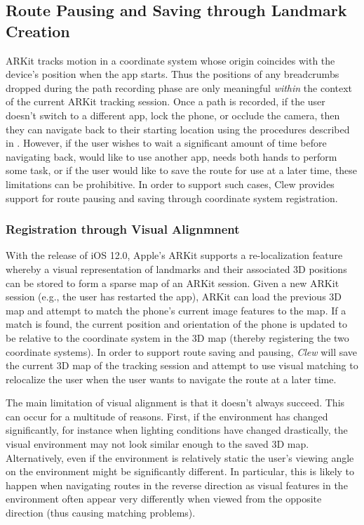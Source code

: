 \documentclass[chi_draft]{sigchi}
\begin{document}
\subsection{Route Pausing and Saving through Landmark Creation}

ARKit tracks motion in a coordinate system whose origin coincides with the device's position when the app starts.  Thus the positions of any breadcrumbs dropped during the path recording phase are only meaningful \emph{within} the context of the current ARKit tracking session.  Once a path is recorded, if the user doesn't switch to a different app, lock the phone, or occlude the camera, then they can navigate back to their starting location using the procedures described in \emph{}.  However, if the user wishes to wait a significant amount of time before navigating back, would like to use another app, needs both hands to perform some task, or if the user would like to save the route for use at a later time, these limitations can be prohibitive.  In order to support such cases, Clew provides support for route pausing and saving through coordinate system registration.

\subsubsection{Registration through Visual Alignmnent}
With the release of iOS 12.0, Apple's ARKit supports a re-localization feature whereby a visual representation of landmarks and their associated 3D positions can be stored to form a sparse map of an ARKit session.  Given a new ARKit session (e.g., the user has restarted the app), ARKit can load the previous 3D map and attempt to match the phone's current image features to the map.  If a match is found, the current position and orientation of the phone is updated to be relative to the coordinate system in the 3D map (thereby registering the two coordinate systems).  In order to support route saving and pausing, \emph{Clew} will save the current 3D map of the tracking session and attempt to use visual matching to relocalize the user when the user wants to navigate the route at a later time.

The main limitation of visual alignment is that it doesn't always succeed.  This can occur for a multitude of reasons.  First, if the environment has changed significantly, for instance when lighting conditions have changed drastically, the visual environment may not look similar enough to the saved 3D map.  Alternatively, even if the environment is relatively static the user's viewing angle on the environment might be significantly different.  In particular, this is likely to happen when navigating routes in the reverse direction as visual features in the environment often appear very differently when viewed from the opposite direction (thus causing matching problems).
\end{document}
